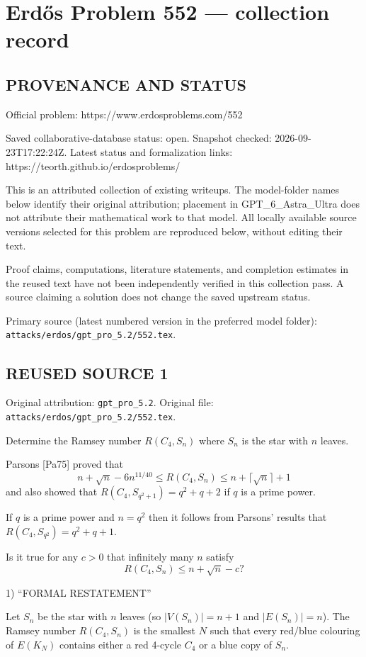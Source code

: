 \section*{Erd\H{o}s Problem 552 --- collection record}

\subsection*{PROVENANCE AND STATUS}
Official problem: https://www.erdosproblems.com/552

Saved collaborative-database status: open.
Snapshot checked: 2026-09-23T17:22:24Z.
Latest status and formalization links: https://teorth.github.io/erdosproblems/

This is an attributed collection of existing writeups. The model-folder names below identify their original attribution; placement in GPT\_6\_Astra\_Ultra does not attribute their mathematical work to that model. All locally available source versions selected for this problem are reproduced below, without editing their text.

Proof claims, computations, literature statements, and completion estimates in the reused text have not been independently verified in this collection pass. A source claiming a solution does not change the saved upstream status.

Primary source (latest numbered version in the preferred model folder): \texttt{attacks/erdos/gpt\_pro\_5.2/552.tex}.

\subsection*{REUSED SOURCE 1}
Original attribution: \texttt{gpt\_pro\_5.2}.
Original file: \texttt{attacks/erdos/gpt\_pro\_5.2/552.tex}.


Determine the Ramsey number $R(C_4,S_n)$ where $S_n$ is the star with $n$ leaves.

Parsons [Pa75] proved that
\[
n+\sqrt{n}-6n^{11/40}\leq R(C_4,S_n)\leq n+\lceil\sqrt{n}\rceil+1
\]
and also showed that $R(C_4,S_{q^2+1})=q^2+q+2$ if $q$ is a prime power.

If $q$ is a prime power and $n=q^2$ then it follows from Parsons' results that $R(C_4,S_{q^2})=q^2+q+1$.

Is it true for any $c>0$ that infinitely many $n$ satisfy 
\[
R(C_4,S_n)\leq n+\sqrt{n}-c?
\]

1) “FORMAL RESTATEMENT”

Let $S_n$ be the star with $n$ leaves (so $|V(S_n)|=n+1$ and $|E(S_n)|=n$). The Ramsey number $R(C_4,S_n)$ is the smallest $N$ such that every red/blue colouring of $E(K_N)$ contains either a red 4-cycle $C_4$ or a blue copy of $S_n$.

